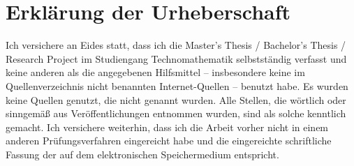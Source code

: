 \documentclass[12pt,final,twoside]{report}
\newcommand{\trtype}{Master's Thesis / Bachelor's Thesis / Research Project} %
\newcommand{\trstudies}{Technomathematik}
\theoremstyle{plain}
\theoremstyle{definition}
\theoremstyle{remark}
\begin{document}
\appendix
\fancyhead[LO,RE]{}                      %

  
\cleardoublepage

  
\cleardoublepage

  
\cleardoublepage


    
\cleardoublepage

\vspace{2cm}
\chapter*{Erkl\"arung der Urheberschaft}
\label{sec:urheber}
Ich versichere an Eides statt, dass ich die \trtype{} im Studiengang \trstudies{} selbstst\"andig verfasst und keine anderen als die angegebenen Hilfsmittel -- insbesondere keine im Quellenverzeichnis nicht benannten Internet-Quellen -- benutzt habe. Es wurden keine Quellen genutzt, die nicht genannt wurden. Alle Stellen, die w\"ortlich oder sinngem\"a{\ss} aus Ver\"offentlichungen entnommen wurden, sind als solche kenntlich gemacht. Ich versichere weiterhin, dass ich die Arbeit vorher nicht in einem anderen Pr\"ufungsverfahren eingereicht habe und die eingereichte schriftliche Fassung der auf dem elektronischen Speichermedium entspricht.

\end{document}
